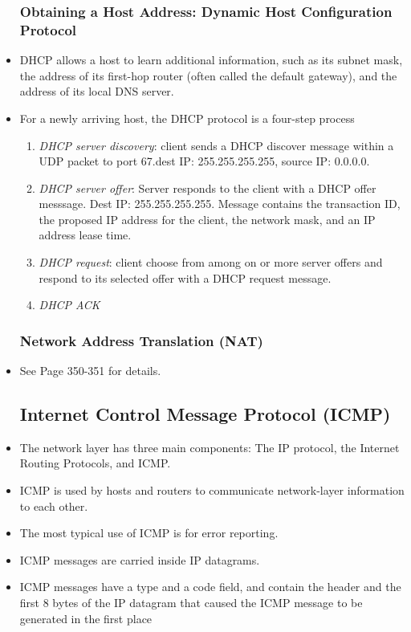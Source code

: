 \documentclass{article}
\begin{document}
\begin{itemize}
\subsubsection{Obtaining a Host Address: Dynamic Host Configuration
  Protocol}
\item DHCP allows a host to learn additional information, such as its
  subnet mask, the address of its first-hop router (often called the
  default gateway), and the address of its local DNS server.
\item For a newly arriving host, the DHCP protocol is a four-step
  process
\begin{enumerate}
\item \emph{DHCP server discovery}: client sends a DHCP discover
  message within a UDP packet to port 67.dest IP: 255.255.255.255,
  source IP: 0.0.0.0.
\item \emph{DHCP server offer}: Server responds to the client with a
  DHCP offer messsage. Dest IP: 255.255.255.255. Message contains the
  transaction ID, the proposed IP address for the client, the network
  mask, and an IP address lease time.
\item \emph{DHCP request}: client choose from among on or more server
  offers and respond to its selected offer with a DHCP request
  message.
\item \emph{DHCP ACK}
\end{enumerate}
\subsubsection{Network Address Translation (NAT)}
\item See Page 350-351 for details.
\subsection{Internet Control Message Protocol (ICMP)}
\item The network layer has three main components: The IP protocol,
  the Internet Routing Protocols, and ICMP.
\item ICMP is used by hosts and routers to communicate network-layer
  information to each other.
\item The most typical use of ICMP is for error reporting.
\item ICMP messages are carried inside IP datagrams.
\item ICMP messages have a type and a code field, and contain the
  header and the first 8 bytes of the IP datagram that caused the ICMP
  message to be generated in the first place

\end{itemize}
\end{document}

